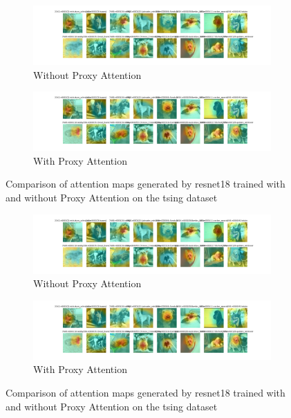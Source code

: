     \begin{figure}[H]
        \centering
        \begin{subfigure}[b]{1\textwidth}
            \includegraphics[width=\textwidth]{images/tsing_resnet18_noproxy_0.pdf}
            \caption{Without Proxy Attention}
        \end{subfigure}
        \hfill
        \begin{subfigure}[b]{1\textwidth}
            \includegraphics[width=\textwidth]{images/tsing_resnet18_proxy_0.pdf}
            \caption{With Proxy Attention}
        \end{subfigure}
        \caption{Comparison of attention maps generated by resnet18 trained with and without Proxy Attention on the tsing dataset}
    \end{figure}
    

    \begin{figure}[H]
        \centering
        \begin{subfigure}[b]{1\textwidth}
            \includegraphics[width=\textwidth]{images/tsing_resnet18_noproxy_0.pdf}
            \caption{Without Proxy Attention}
        \end{subfigure}
        \hfill
        \begin{subfigure}[b]{1\textwidth}
            \includegraphics[width=\textwidth]{images/tsing_resnet18_proxy_0.pdf}
            \caption{With Proxy Attention}
        \end{subfigure}
        \caption{Comparison of attention maps generated by resnet18 trained with and without Proxy Attention on the tsing dataset}
    \end{figure}
    
